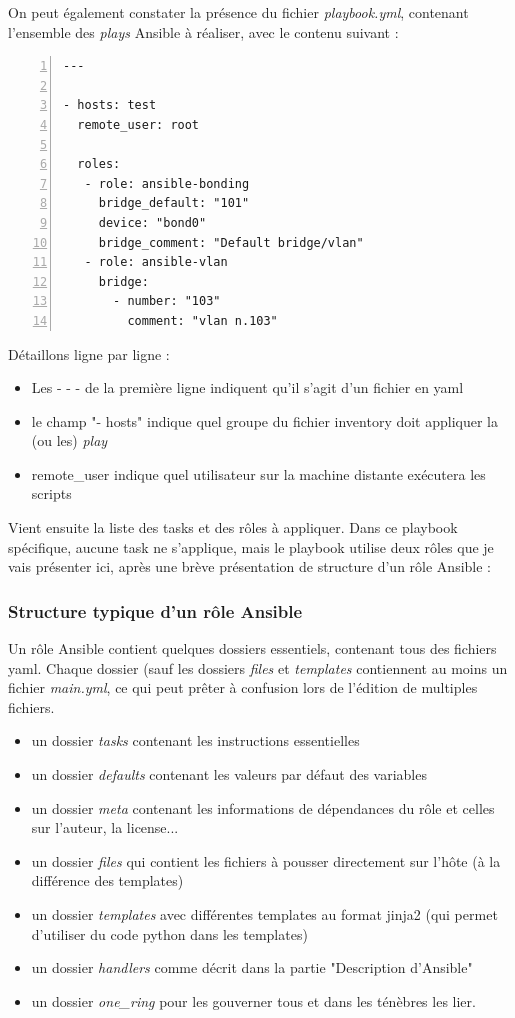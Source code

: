 \documentclass[14 pt,a4paper]{extreport}
\begin{document}
On peut également constater la présence du fichier \emph{playbook.yml}, contenant l'ensemble des \emph{plays} Ansible à réaliser, avec le contenu suivant :

\begin{framed}
\begin{Verbatim}[fontsize=\scriptsize,numbers=left]
---

- hosts: test
  remote_user: root

  roles:
   - role: ansible-bonding
     bridge_default: "101"
     device: "bond0"
     bridge_comment: "Default bridge/vlan"
   - role: ansible-vlan
     bridge:
       - number: "103"
         comment: "vlan n.103"
\end{Verbatim}
\end{framed}

Détaillons ligne par ligne :
\begin{itemize}
	\item Les - - - de la première ligne indiquent qu'il s'agit d'un fichier en yaml
	\item le champ "- hosts" indique quel groupe du fichier inventory doit appliquer la (ou les) \emph{play}
	\item remote\_user indique quel utilisateur sur la machine distante exécutera les scripts
\end{itemize}

Vient ensuite la liste des tasks et des rôles à appliquer. Dans ce playbook spécifique, aucune task ne s'applique, mais le playbook utilise deux rôles que je vais présenter ici, après une brève présentation de structure d'un rôle Ansible :

\subsubsection*{Structure typique d'un rôle Ansible}

Un rôle Ansible contient quelques dossiers essentiels, contenant tous des fichiers yaml. Chaque dossier (sauf les dossiers \emph{files} et \emph{templates} contiennent au moins un fichier \emph{main.yml}, ce qui peut prêter à confusion lors de l'édition de multiples fichiers.
\begin{itemize}
	\item un dossier \emph{tasks} contenant les instructions essentielles
	\item un dossier \emph{defaults} contenant les valeurs par défaut des variables
	\item un dossier \emph{meta} contenant les informations de dépendances du rôle et celles sur l'auteur, la license...
	\item un dossier \emph{files} qui contient les fichiers à pousser directement sur l'hôte (à la différence des templates)
	\item un dossier \emph{templates} avec différentes templates au format jinja2 (qui permet d'utiliser du code python dans les templates)
	\item un dossier \emph{handlers} comme décrit dans la partie "Description d'Ansible"
	\item un dossier \emph{one\_ring} pour les gouverner tous et dans les ténèbres les lier.
\end{itemize}
\end{document}
